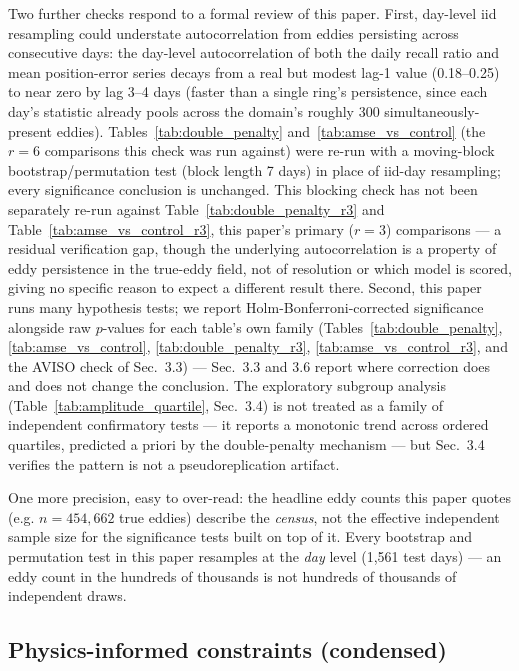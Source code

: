 \documentclass[11pt]{article}
\begin{document}
Two further checks respond to a formal review of this paper. First, day-level iid resampling could understate autocorrelation from eddies persisting across consecutive days: the day-level autocorrelation of both the daily recall ratio and mean position-error series decays from a real but modest lag-1 value (0.18--0.25) to near zero by lag 3--4 days (faster than a single ring's persistence, since each day's statistic already pools across the domain's roughly 300 simultaneously-present eddies). Tables~\ref{tab:double_penalty} and~\ref{tab:amse_vs_control} (the $r=6$ comparisons this check was run against) were re-run with a moving-block bootstrap/permutation test (block length 7 days) in place of iid-day resampling; every significance conclusion is unchanged. This blocking check has not been separately re-run against Table~\ref{tab:double_penalty_r3} and Table~\ref{tab:amse_vs_control_r3}, this paper's primary ($r=3$) comparisons --- a residual verification gap, though the underlying autocorrelation is a property of eddy persistence in the true-eddy field, not of resolution or which model is scored, giving no specific reason to expect a different result there. Second, this paper runs many hypothesis tests; we report Holm-Bonferroni-corrected significance alongside raw $p$-values for each table's own family (Tables~\ref{tab:double_penalty}, \ref{tab:amse_vs_control}, \ref{tab:double_penalty_r3}, \ref{tab:amse_vs_control_r3}, and the AVISO check of Sec.~3.3) --- Sec.~3.3 and 3.6 report where correction does and does not change the conclusion. The exploratory subgroup analysis (Table~\ref{tab:amplitude_quartile}, Sec.~3.4) is not treated as a family of independent confirmatory tests --- it reports a monotonic trend across ordered quartiles, predicted a priori by the double-penalty mechanism --- but Sec.~3.4 verifies the pattern is not a pseudoreplication artifact.

One more precision, easy to over-read: the headline eddy counts this paper quotes (e.g. $n=454{,}662$ true eddies) describe the \textit{census}, not the effective independent sample size for the significance tests built on top of it. Every bootstrap and permutation test in this paper resamples at the \textit{day} level (1,561 test days) --- an eddy count in the hundreds of thousands is not hundreds of thousands of independent draws.

\subsection{Physics-informed constraints (condensed)}
\end{document}
